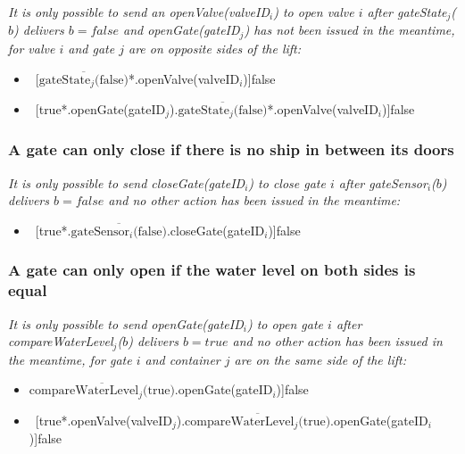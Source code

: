 \noindent\textit{It is only possible to send an openValve(valveID$_i$) to open valve $i$ after gateState$_j$($ b $) delivers $b = false$ and openGate(gateID$_j$) has not been issued in the meantime, for valve $i$ and gate $j$ are on opposite sides of the lift:}
	\begin{itemize}
		\item ~[$\overline{\textrm{gateState$_j$(false)}}$*.openValve(valveID$_i$)]false
		\item ~[true*.openGate(gateID$_j$).$\overline{\textrm{gateState$_j$(false)}}$*.openValve(valveID$_i$)]false
	\end{itemize}
	
\subsubsection{A gate can only close if there is no ship in between its doors}
\textit{It is only possible to send closeGate(gateID$_i$) to close gate $i$ after gateSensor$_i$($b$) delivers $b = false$ and no other action has been issued in the meantime:}
	\begin{itemize}
		\item ~[true*.$\overline{\textrm{gateSensor$_i$(false)}}$.closeGate(gateID$_i$)]false
	\end{itemize}
	
\subsubsection{A gate can only open if the water level on both sides is equal}
\textit{It is only possible to send openGate(gateID$_i$) to open gate $i$ after \linebreak compareWaterLevel$_j$($b$) delivers $b = true$ and no other action has been issued in the meantime, for gate $i$ and container $j$ are on the same side of the lift:}
	\begin{itemize}
		\item $\overline{\textrm{compareWaterLevel$_j$(true)}}$.openGate(gateID$_i$)]false
		\item ~[true*.openValve(valveID$_j$).$\overline{\textrm{compareWaterLevel$_j$(true)}}$.openGate(gateID$_i$)]false
	\end{itemize}


